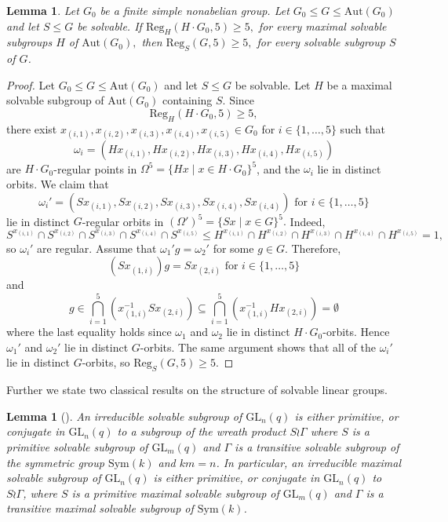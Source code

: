 \documentclass[a4paper,reqno,11pt]{amsart}
\newtheorem{Lem}[Th]{Lemma}
\theoremstyle{definition}
\theoremstyle{remark}
\numberwithin{equation}{section}
\newcommand{\Sym}{\mathrm{Sym}}
\newcommand{\Reg}{\mathrm{Reg}}
\newcommand{\Aut}{\mathrm{Aut}}
\newcommand{\GL}{{\mathrm{GL}}}
\begin{document}
\begin{Lem}\label{SdotG0}
Let $G_0$ be a finite simple nonabelian group. Let $G_0 \le G \le \Aut (G_0)$ and let $S\le G$ be solvable. If  $\Reg_H(H \cdot G_0,5)\ge 5,$ for every maximal solvable subgroups $H$ of $\Aut(G_0),$ then $\Reg_S(G,5)\ge 5,$ for every solvable subgroup $S$ of $G$.
\end{Lem}
\begin{proof} Let $G_0 \le G \le \Aut (G_0)$ and let $S\le G$ be solvable. Let $H$ be a maximal solvable subgroup of $  \Aut(G_0)$ containing $S$. Since 
$$\Reg_H(H \cdot G_0,5)\ge 5,$$
 there exist $x_{(i,1)},x_{(i,2)},x_{(i,3)},x_{(i,4)},x_{(i,5)} \in G_0$ for $i \in\{1, \ldots, 5\}$ such that
$$\omega_i=(Hx_{(i,1)},Hx_{(i,2)},Hx_{(i,3)},Hx_{(i,4)},Hx_{(i,5)})$$ 
are $H \cdot G_0$-regular points   in $\Omega^5=\{Hx \mid x \in H \cdot G_0 \}^5$, and the $\omega_i$ lie in distinct orbits. 
We claim that $$\omega_i'=(Sx_{(i,1)},Sx_{(i,2)},Sx_{(i,3)},Sx_{(i,4)},Sx_{(i,4)}) \text{ for } i \in \{1, \ldots, 5\}$$ lie in distinct $G$-regular orbits in $(\Omega')^5=\{Sx \mid x \in G\}^5.$ Indeed, $$S^{x_{(i,1)}} \cap S^{x_{(i,2)}} \cap S^{x_{(i,3)}} \cap S^{x_{(i,4)}} \cap S^{x_{(i,5)}} \le H^{x_{(i,1)}} \cap H^{x_{(i,2)}} \cap H^{x_{(i,3)}} \cap H^{x_{(i,4)}} \cap H^{x_{(i,5)}}=1,$$ so $\omega_i'$ are regular. Assume that $\omega_1' g = \omega_2'$ for some $g \in G.$ Therefore,
$$(Sx_{(1,i)})g=Sx_{(2,i)} \text{ for } i \in \{1, \ldots, 5\}$$
and 
$$g \in \bigcap_{i=1}^5 (x_{(1,i)}^{-1}S x_{(2,i)}) \subseteq \bigcap_{i=1}^5 (x_{(1,i)}^{-1}H x_{(2,i)})= \emptyset$$
where the last equality holds since $\omega_1$ and $\omega_2$ lie in distinct $H \cdot G_0$-orbits. Hence $\omega_1'$ and $\omega_2'$ lie in distinct $G$-orbits. The same argument shows that all of the $\omega_i'$ lie in distinct $G$-orbits, so $\Reg_S(G,5)\ge 5$.
\end{proof}


  Further we state two classical results on the structure of solvable linear groups.
\begin{Lem}[{\cite[\S 18, Theorem 5]{sup}}] \label{supirr}
An irreducible solvable subgroup of $\GL_n(q)$ is either primitive, or conjugate in $\GL_n(q)$ to a subgroup of the wreath product
$S \wr \Gamma$
where $S$ is a primitive solvable subgroup of $\GL_m(q)$ and $\Gamma$ is a transitive solvable
subgroup of the symmetric group $\Sym(k)$ and $km = n$. In particular, an irreducible maximal solvable  subgroup of 
$\GL_n(q)$ is either primitive, or conjugate in $\GL_n(q)$
to  $S \wr \Gamma$, where $S$ is a  primitive maximal solvable subgroup of $\GL_m(q)$
and $\Gamma$ is a  transitive maximal solvable subgroup of $\Sym(k)$.
\end{Lem}
\end{document}
